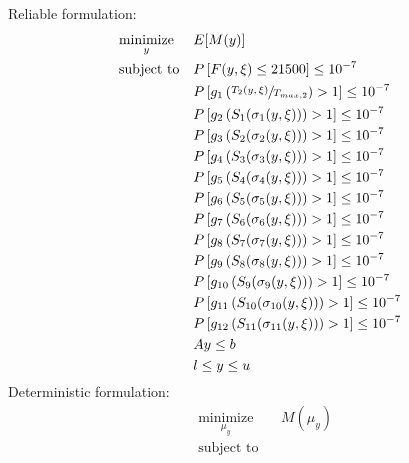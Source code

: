 \documentclass{article}
\begin{document}
\begin{multicols}{2}
\centering
Reliable formulation:
\begin{equation}
\label{eq:specific_reliable_optim}
\begin{aligned}
& \underset{y}{\text{minimize}}
& & E[M(y)] \\
& \text{subject to}
& & P \left[ F(y,\xi) \leq 21500 \right] \leq 10^{-7} \\
& & & P \left[ g_1 \left( \sfrac{T_2(y,\xi)}{T_{max,2}} \right) > 1 \right] \leq 10^{-7} \\
& & & P \left[ g_2 \left( S_1 ( \sigma_1(y,\xi) ) \right) > 1 \right] \leq 10^{-7} \\
& & & P \left[ g_3 \left( S_2 ( \sigma_2(y,\xi) ) \right) > 1 \right] \leq 10^{-7} \\
& & & P \left[ g_4 \left( S_3 ( \sigma_3(y,\xi) ) \right) > 1 \right] \leq 10^{-7} \\
& & & P \left[ g_5 \left( S_4 ( \sigma_4(y,\xi) ) \right) > 1 \right] \leq 10^{-7} \\
& & & P \left[ g_6 \left( S_5 ( \sigma_5(y,\xi) ) \right) > 1 \right] \leq 10^{-7} \\
& & & P \left[ g_7 \left( S_6 ( \sigma_6(y,\xi) ) \right) > 1 \right] \leq 10^{-7} \\
& & & P \left[ g_8 \left( S_7 ( \sigma_7(y,\xi) ) \right) > 1 \right] \leq 10^{-7} \\
& & & P \left[ g_9 \left( S_8 ( \sigma_8(y,\xi) ) \right) > 1 \right] \leq 10^{-7} \\
& & & P \left[ g_{10} \left( S_9 ( \sigma_9(y,\xi) ) \right) > 1 \right] \leq 10^{-7} \\
& & & P \left[ g_{11} \left( S_{10} ( \sigma_{10}(y,\xi) ) \right) > 1 \right] \leq 10^{-7} \\
& & & P \left[ g_{12} \left( S_{11} ( \sigma_{11}(y,\xi) ) \right) > 1 \right] \leq 10^{-7} \\
& & & Ay \leq b \\
& & & l \leq y \leq u \\
\end{aligned}
\end{equation}
\vfill \columnbreak
Deterministic formulation: 
\begin{equation}
\label{eq:specific_reliable_equiv_deterministic_optim}
\begin{aligned}
& \underset{\mu_y}{\text{minimize}}
& & M(\mu_y) \\
& \text{subject to}

\end{aligned}
\end{equation}
\end{multicols}
\end{document}

